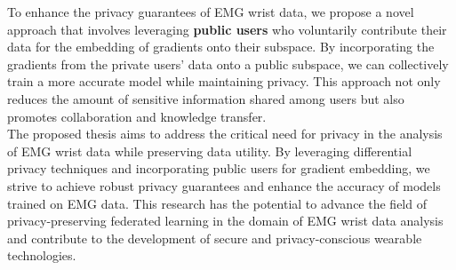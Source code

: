 To enhance the privacy guarantees of EMG wrist data, we propose a novel approach that involves leveraging \textbf{public users} who voluntarily contribute their data for the embedding of gradients onto their subspace. By incorporating the gradients from the private users' data onto a public subspace, we can collectively train a more accurate model while maintaining privacy. This approach not only reduces the amount of sensitive information shared among users but also promotes collaboration and knowledge transfer.\\


The proposed thesis aims to address the critical need for privacy in the analysis of EMG wrist data while preserving data utility. By leveraging differential privacy techniques and incorporating public users for gradient embedding, we strive to achieve robust privacy guarantees and enhance the accuracy of models trained on EMG data. This research has the potential to advance the field of privacy-preserving federated learning in the domain of EMG wrist data analysis and contribute to the development of secure and privacy-conscious wearable technologies.






